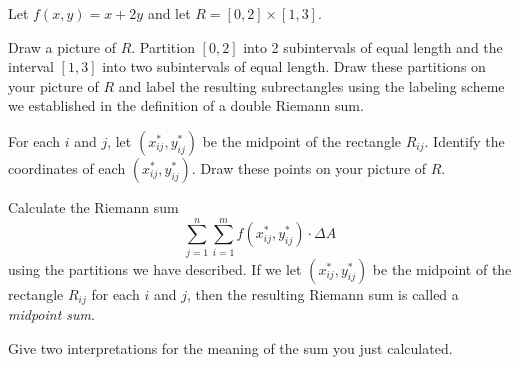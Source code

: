 \begin{activity} \label{A:11.1.2} Let $f(x,y) = x+2y$ and let $R = [0,2] \times [1,3]$.
	\ba
	\item Draw a picture of $R$. Partition $[0,2]$ into 2 subintervals of equal length and the interval $[1,3]$ into two subintervals of equal length. Draw these partitions on your picture of $R$ and label the resulting subrectangles using the labeling scheme we established in the definition of a double Riemann sum.
	
	
	
	\item For each $i$ and $j$, let $(x_{ij}^*, y_{ij}^*)$ be the midpoint of the rectangle $R_{ij}$. Identify the coordinates of each $(x_{ij}^*, y_{ij}^*)$. Draw these points on your picture of $R$.
	
	
	
	\item Calculate the Riemann sum
\[\sum_{j=1}^n \sum_{i=1}^m f(x_{ij}^*, y_{ij}^*) \cdot \Delta A\]
using the partitions we have described. If we let $(x_{ij}^*, y_{ij}^*)$ be the midpoint of the rectangle $R_{ij}$ for each $i$ and $j$, then the resulting Riemann sum is called a \emph{midpoint sum}.



	\item Give two interpretations for the meaning of the sum you just calculated.


    \ea


\end{activity}
\begin{smallhint}

\end{smallhint}
\begin{bighint}

\end{bighint}
